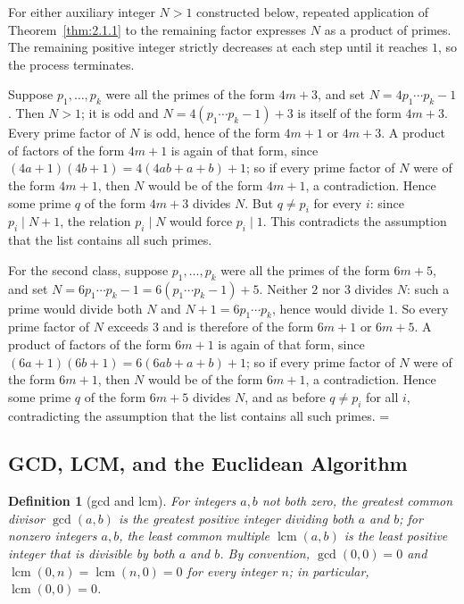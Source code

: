 \documentclass[11pt]{article}
\makeatletter
\let\nt@closedisplay\]
\def\nt@guardedclose{\@ifnextchar\par{\nt@closeafterpar}{\@ifnextchar\end{\postdisplaypenalty\@M\nt@closedisplay}{\nt@closedisplay}}}
\def\nt@closeafterpar\par{\@ifnextchar\par{\nt@closeafterpar}{\@ifnextchar\end{\postdisplaypenalty\@M\nt@closedisplay\par}{\nt@closedisplay\par}}}
\renewenvironment{proof}[1][\proofname]{\par
  \pushQED{\qed}\normalfont\topsep\medskipamount\edef\nt@afterproof{\@endparpenalty=\the\@endparpenalty\relax}\@beginparpenalty\@M\@endparpenalty\@M\let\]\nt@guardedclose\trivlist\item[]\textit{#1\@addpunct{.}} \ignorespaces}{\ifvmode\addpenalty\@M\fi\popQED\nt@afterproof\endtrivlist\@endpefalse}
\theoremstyle{ntstyle}
\newtheorem{definition}{Definition}[subsection]
\DeclareMathOperator{\lcm}{lcm}
\makeatother
\begin{document}
\begin{proof} For either auxiliary integer $N>1$ constructed below,
  repeated application of Theorem~\ref{thm:2.1.1} to the remaining factor
  expresses $N$ as a product of primes. The remaining positive integer
  strictly decreases at each step until it reaches $1$, so the process terminates.

  Suppose $p_1,\ldots,p_k$ were all the primes
  of the form $4m+3$, and set $N=4p_1\cdots p_k-1$. Then $N>1$; it is odd and
  $N=4(p_1\cdots p_k-1)+3$ is itself of the form $4m+3$. Every prime factor
  of $N$ is odd, hence of the form $4m+1$ or $4m+3$. A product of factors
  of the form $4m+1$ is again of that form, since
  $(4a+1)(4b+1)=4(4ab+a+b)+1$; so if every prime factor of $N$ were of the
  form $4m+1$, then $N$ would be of the form $4m+1$, a contradiction. Hence
  some prime $q$ of the form $4m+3$ divides $N$. But $q\neq p_i$ for every $i$: since $p_i\mid N+1$, the relation
  $p_i\mid N$ would force $p_i\mid1$. This contradicts the assumption that the list contains all such primes.

  For the second class, suppose $p_1,\ldots,p_k$ were all the primes of the
  form $6m+5$, and set $N=6p_1\cdots p_k-1=6(p_1\cdots p_k-1)+5$. Neither
  $2$ nor $3$ divides $N$: such a prime would divide both $N$ and
  $N+1=6p_1\cdots p_k$, hence would divide $1$. So every prime factor of
  $N$ exceeds $3$ and is therefore of the form $6m+1$ or $6m+5$. A product
  of factors of the form $6m+1$ is again of that form, since
  $(6a+1)(6b+1)=6(6ab+a+b)+1$; so if every prime factor of $N$ were of the
  form $6m+1$, then $N$ would be of the form $6m+1$, a contradiction. Hence
  some prime $q$ of the form $6m+5$ divides $N$, and as before $q\neq p_i$
  for all $i$, contradicting the assumption that the list contains all such primes.
\end{proof}
\subsection{GCD, LCM, and the Euclidean Algorithm}

\begin{definition}[gcd and lcm]\label{def:2.2.1}\label{def:gcd-and-lcm}
  For integers $a, b$ not both zero, the greatest common divisor $\gcd(a, b)$ is the greatest positive integer
  dividing both $a$ and $b$; for nonzero integers $a, b$,
  the least common multiple $\lcm(a, b)$ is the least positive integer that is
  divisible by both $a$ and $b$. By convention, $\gcd(0, 0)=0$ and $\lcm(0, n)=\lcm(n, 0)=0$
  for every integer $n$; in particular, $\lcm(0, 0)=0$.

\end{definition}
\end{document}
